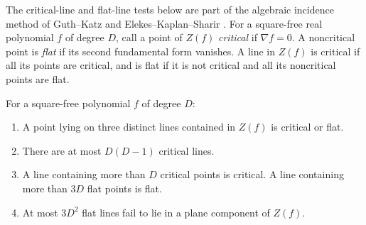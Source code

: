 The critical-line and flat-line tests below are part of the algebraic
incidence method of Guth--Katz and Elekes--Kaplan--Sharir
\cite{guthkatz2010kakeya,elekeskaplansharir2011}.
For a square-free real polynomial $f$ of degree $D$, call a point of
$Z(f)$ \emph{critical} if $\nabla f=0$.  A noncritical point is
\emph{flat} if its second fundamental form vanishes.  A line in $Z(f)$
is critical if all its points are critical, and is flat if it is not
critical and all its noncritical points are flat.

\begin{lemma}\label{ci:flat}
For a square-free polynomial $f$ of degree $D$:
\begin{enumerate}
\item A point lying on three distinct lines contained in $Z(f)$ is
critical or flat.
\item There are at most $D(D-1)$ critical lines.
\item A line containing more than $D$ critical points is critical.
A line containing more than $3D$ flat points is flat.
\item At most $3D^2$ flat lines fail to lie in a plane component of
$Z(f)$.
\end{enumerate}
\end{lemma}

